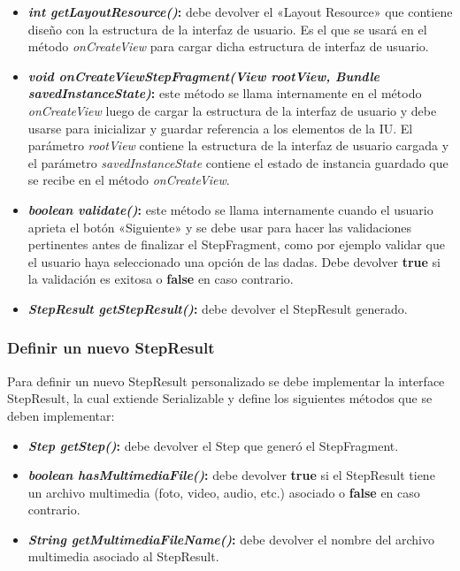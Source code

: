 \begin{itemize} 
  \item \textbf{\textit{int getLayoutResource()}:} debe devolver el «Layout Resource» que contiene diseño con la estructura de la interfaz de usuario. Es el que se usará en el método \textit{onCreateView} para cargar dicha estructura de interfaz de usuario.
  
  
  \item \textbf{\textit{void onCreateViewStepFragment(View rootView, Bundle savedInstanceState)}:} este método se llama internamente en el método \textit{onCreateView} luego de cargar la estructura de la interfaz de usuario y debe usarse para inicializar  y guardar referencia a los elementos de la IU. El parámetro \textit{rootView} contiene la estructura de la interfaz de usuario cargada y el parámetro \textit{savedInstanceState} contiene el estado de instancia guardado que se recibe en el método \textit{onCreateView}.
    

  
  \item \textbf{\textit{boolean validate()}:} este método se llama internamente cuando el usuario aprieta el botón «Siguiente» y se debe usar para hacer las validaciones pertinentes antes de finalizar el StepFragment, como por ejemplo validar que el usuario haya seleccionado una opción de las dadas. Debe devolver \textbf{true} si la validación es exitosa o \textbf{false} en caso contrario.  
  
  \item \textbf{\textit{StepResult getStepResult()}:} debe devolver el StepResult generado.


\end{itemize}

\subsubsection{Definir un nuevo StepResult}
Para definir un nuevo StepResult personalizado se debe implementar la interface StepResult, la cual extiende Serializable y define los siguientes métodos que se deben implementar:

\begin{itemize} 
  \item \textbf{\textit{Step getStep()}:} debe devolver el Step que generó el StepFragment.
  
  
  \item \textbf{\textit{boolean hasMultimediaFile()}:} debe devolver \textbf{true} si el StepResult tiene un archivo multimedia (foto, video, audio, etc.) asociado o \textbf{false} en caso contrario.
    
    
  \item \textbf{\textit{String getMultimediaFileName()}:} debe devolver el nombre del archivo multimedia asociado al StepResult.

\end{itemize}


